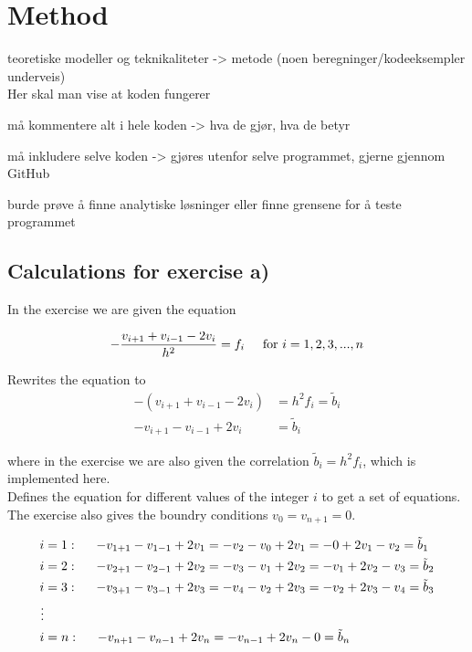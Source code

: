 \documentclass{article}
\begin{document}
\section{Method}

  teoretiske modeller og teknikaliteter -> metode (noen beregninger/kodeeksempler underveis) \\
  Her skal man vise at koden fungerer

  må kommentere alt i hele koden -> hva de gjør, hva de betyr

  må inkludere selve koden -> gjøres utenfor selve programmet, gjerne gjennom GitHub

  burde prøve å finne analytiske løsninger eller finne grensene for å teste programmet

  \subsection{Calculations for exercise a)}

    In the exercise we are given the equation

    \begin{equation*}
      - \frac{v_{i+1} + v_{i-1} - 2 v_i}{h^2} = f_i \hspace{5mm} \textrm{for} ~  i = 1, 2, 3, ... , n
    \end{equation*}

    Rewrites the equation to
    \begin{align*}
      - (v_{i+1} + v_{i-1} - 2 v_i) &= h^2 f_i = \tilde{b}_i \\
      - v_{i+1} - v_{i-1} + 2 v_i &= \tilde{b}_i
    \end{align*}

    where in the exercise we are also given the correlation $\tilde{b}_i = h^2 f_i$, which is implemented here. \\

    Defines the equation for different values of the integer $i$ to get a set of equations. The exercise also gives the boundry conditions $v_0 = v_{n+1} = 0$.

    \begin{align*}
      i &= 1 : \hspace{5mm} - v_{1+1} - v_{1-1} + 2 v_1 = - v_2 - v_0 + 2 v_1 = - 0 + 2 v_1 - v_2 = \tilde{b}_1 \\
      i &= 2 : \hspace{5mm} - v_{2+1} - v_{2-1} + 2 v_2 = - v_3 - v_1 + 2 v_2 = - v_1 + 2 v_2 - v_3 = \tilde{b}_2 \\
      i &= 3 : \hspace{5mm} - v_{3+1} - v_{3-1} + 2 v_3 = - v_4 - v_2 + 2 v_3 = - v_2 + 2 v_3 - v_4 = \tilde{b}_3 \\
      \vdots \\
      i &= n : \hspace{5mm} - v_{n+1} - v_{n-1} + 2 v_n = - v_{n-1} + 2 v_n - 0 = \tilde{b}_n \\
    \end{align*}
\end{document}
